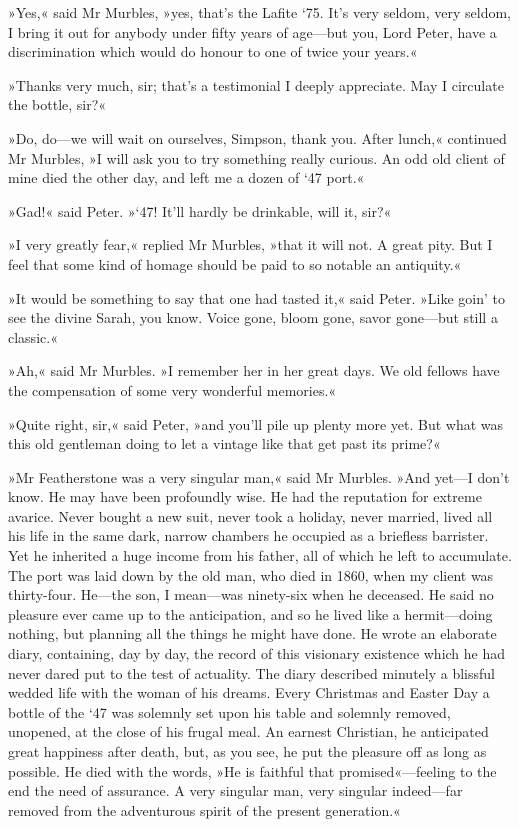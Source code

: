 »Yes,« said Mr Murbles, »yes, that's the Lafite `75. It's very seldom, very seldom, I bring it out for anybody under fifty years of age—but you, Lord Peter, have a discrimination which would do honour to one of twice your years.«

»Thanks very much, sir; that's a testimonial I deeply appreciate. May I circulate the bottle, sir?«

»Do, do—we will wait on ourselves, Simpson, thank you. After lunch,« continued Mr Murbles, »I will ask you to try something really curious.  An odd old client of mine died the other day, and left me a dozen of `47 port.«

»Gad!« said Peter. »`47! It'll hardly be drinkable, will it, sir?«

»I very greatly fear,« replied Mr Murbles, »that it will not. A great pity. But I feel that some kind of homage should be paid to so notable an antiquity.«

»It would be something to say that one had tasted it,« said Peter. »Like goin' to see the divine Sarah, you know. Voice gone, bloom gone, savor gone—but still a classic.«

»Ah,« said Mr Murbles. »I remember her in her great days. We old fellows have the compensation of some very wonderful memories.«

»Quite right, sir,« said Peter, »and you'll pile up plenty more yet.  But what was this old gentleman doing to let a vintage like that get past its prime?«

»Mr Featherstone was a very singular man,« said Mr Murbles. »And yet—I don't know. He may have been profoundly wise. He had the reputation for extreme avarice. Never bought a new suit, never took a holiday, never married, lived all his life in the same dark, narrow chambers he occupied as a briefless barrister. Yet he inherited a huge income from his father, all of which he left to accumulate. The port was laid down by the old man, who died in 1860, when my client was thirty-four. He—the son, I mean—was ninety-six when he deceased. He said no pleasure ever came up to the anticipation, and so he lived like a hermit—doing nothing, but planning all the things he might have done. He wrote an elaborate diary, containing, day by day, the record of this visionary existence which he had never dared put to the test of actuality. The diary described minutely a blissful wedded life with the woman of his dreams. Every Christmas and Easter Day a bottle of the `47 was solemnly set upon his table and solemnly removed, unopened, at the close of his frugal meal. An earnest Christian, he anticipated great happiness after death, but, as you see, he put the pleasure off as long as possible. He died with the words, »He is faithful that promised«—feeling to the end the need of assurance. A very singular man, very singular indeed—far removed from the adventurous spirit of the present generation.«


